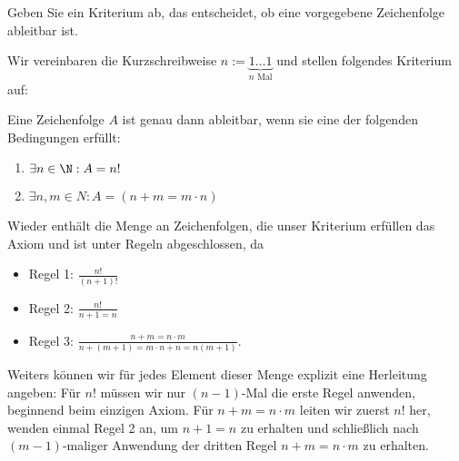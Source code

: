 
\begin{exercise}[56]

Geben Sie ein Kriterium ab, das entscheidet, ob eine vorgegebene Zeichenfolge
ableitbar ist.
\end{exercise}


\begin{solution}

Wir vereinbaren die Kurzschreibweise $n := \underbrace{1\dots 1}_{n \text{ Mal}}$
und stellen folgendes Kriterium auf:

Eine Zeichenfolge $A$ ist genau dann ableitbar, wenn sie eine der folgenden
Bedingungen erfüllt:
\begin{enumerate}[label = \alph*)]
  \item $\exists n \in \N: A = n!$
  \item $\exists n,m \in N: A = (n + m = m\cdot n)$
\end{enumerate}
Wieder enthält die Menge an Zeichenfolgen, die unser Kriterium erfüllen das Axiom
und ist unter Regeln abgeschlossen, da
\begin{itemize}
  \item Regel 1: $\frac{n!}{(n+1)!}$
  \item Regel 2: $\frac{n!}{n + 1 = n}$
  \item Regel 3: $\frac{n + m = n\cdot m}{n + (m + 1) = m\cdot n + n = n(m+1)}$.
\end{itemize}
Weiters können wir für jedes Element dieser Menge explizit eine Herleitung angeben:
Für $n!$ müssen wir nur $(n-1)$-Mal die erste Regel anwenden, beginnend beim
einzigen Axiom. Für $n + m = n\cdot m$ leiten wir zuerst $n!$ her, wenden
einmal Regel 2 an, um $n + 1 = n$ zu erhalten und schließlich nach $(m-1)$-maliger
Anwendung der dritten Regel $n + m = n \cdot m$ zu erhalten.
\end{solution}

